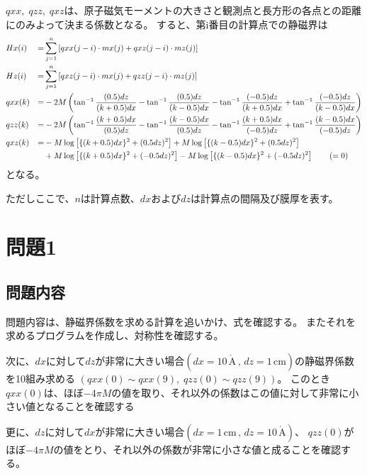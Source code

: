 \documentclass{jsarticle}
\begin{document}
$qxx,\;qzz,\;qxz$は、原子磁気モーメントの大きさと観測点と長方形の各点との距離にのみよって決まる係数となる。
すると、第i番目の計算点での静磁界は
\begin{alignat}{2}
	&Hx(i) &= &\sum_{j=1}^{n} \left[ qxx(j-i)\cdot mx(j) + qxz(j-i)\cdot mz(j) \right]	\\
	&Hz(i) &= &\sum_{j=1}^{n} \left[ qxz(j-i)\cdot mx(j) + qzz(j-i)\cdot mz(j) \right]	\\
	&qxx(k) &= &-2M\left( \tan^{-1}\frac{(0.5)dz}{(k+0.5)dx} - \tan^{-1}\frac{(0.5)dz}{(k-0.5)dx} - \tan^{-1}\frac{(-0.5)dz}{(k+0.5)dx} + \tan^{-1}\frac{(-0.5)dz}{(k-0.5)dx} \right)	\\
	&qzz(k) &= &-2M\left( \tan^{-1}\frac{(k+0.5)dx}{(0.5)dz} - \tan^{-1}\frac{(k-0.5)dx}{(0.5)dz} - \tan^{-1}\frac{(k+0.5)dx}{(-0.5)dz} + \tan^{-1}\frac{(k-0.5)dx}{(-0.5)dz} \right)	\\
	&qxz(k) &= &-M\log\left[ \{(k+0.5)dx\}^2 + (0.5dz)^2 \right] + M\log\left[ \{(k-0.5)dx\}^2 + (0.5dz)^2 \right]	\notag \\
			 &&&+M\log\left[ \{(k+0.5)dx\}^2 + (-0.5dz)^2 \right] - M\log\left[ \{(k-0.5)dx\}^2 + (-0.5dz)^2 \right] \qquad (=0)
\end{alignat}
となる。

ただしここで、$n$は計算点数、$dx$および$dz$は計算点の間隔及び膜厚を表す。

\section{問題1}
\subsection{問題内容}
問題内容は、静磁界係数を求める計算を追いかけ、式を確認する。
またそれを求めるプログラムを作成し、対称性を確認する。

次に、$dx$に対して$dz$が非常に大きい場合$(dx\!=\!10\,\mathrm{\mathring{A}}\,,\,dz\!=\!1\,\mathrm{cm})$の静磁界係数を10組み求める
$(qxx(0)\sim qxx(9),\;qzz(0)\sim qzz(9))$。
このとき$qxx(0)$は、ほぼ$-4\pi M$の値を取り、それ以外の係数はこの値に対して非常に小さい値となることを確認する

更に、$dz$に対して$dx$が非常に大きい場合$(dx\!=\!1\,\mathrm{cm}\,,\,dz\!=\!10\,\mathrm{\mathring{A}})$、
$qzz(0)$がほぼ$-4\pi M$の値をとり、それ以外の係数が非常に小さな値と成ることを確認する。
\end{document}
